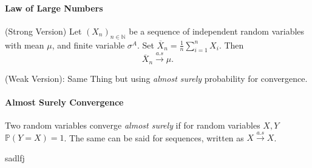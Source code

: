 \paragraph{Law of Large Numbers}
(Strong Version) Let \( (X_n)_{n \in \mathbb{N}} \) be a sequence of independent
random variables with mean \( \mu \), and finite variable  \( \sigma^A\).
Set \( \overline{X}_n = \frac{1}{n} \sum_{i=1}^n X_i \).
Then  \[
    \overline{X}_n \xrightarrow{a.s} \mu
.\]

(Weak Version): Same Thing but using \textit{almost surely}
probability for convergence.

\paragraph{Almost Surely Convergence}
Two random variables converge \textit{almost surely} if for
random variables \( X, Y \)
\( \mathbb{P}(Y = X) = 1 \). The same can be said for sequences,
written as \( X \xrightarrow{a.s} X\).

sadlfj

